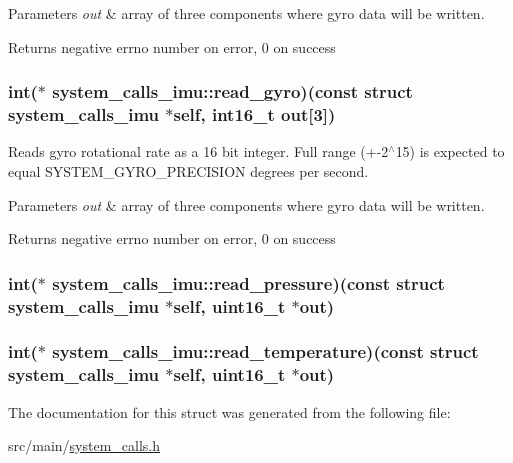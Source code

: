 \begin{DoxyParams}{Parameters}
{\em out} & array of three components where gyro data will be written. \\
\hline
\end{DoxyParams}
\begin{DoxyReturn}{Returns}
negative errno number on error, 0 on success 
\end{DoxyReturn}
\hypertarget{structsystem__calls__imu_ab1f03b777e691071d7e4a3457ddf2bc9}{
\subsubsection[{read\+\_\+gyro}]{\setlength{\rightskip}{0pt plus 5cm}int($\ast$ system\+\_\+calls\+\_\+imu\+::read\+\_\+gyro)(const struct {\bf system\+\_\+calls\+\_\+imu} $\ast$self, int16\+\_\+t out\mbox{[}3\mbox{]})}}\label{structsystem__calls__imu_ab1f03b777e691071d7e4a3457ddf2bc9}
Reads gyro rotational rate as a 16 bit integer. Full range (+-\/2$^\wedge$15) is expected to equal S\+Y\+S\+T\+E\+M\+\_\+\+G\+Y\+R\+O\+\_\+\+P\+R\+E\+C\+I\+S\+I\+O\+N degrees per second.


\begin{DoxyParams}{Parameters}
{\em out} & array of three components where gyro data will be written. \\
\hline
\end{DoxyParams}
\begin{DoxyReturn}{Returns}
negative errno number on error, 0 on success 
\end{DoxyReturn}
\hypertarget{structsystem__calls__imu_a3c4156ffcb688f20f98f289c7340ae3d}{
\subsubsection[{read\+\_\+pressure}]{\setlength{\rightskip}{0pt plus 5cm}int($\ast$ system\+\_\+calls\+\_\+imu\+::read\+\_\+pressure)(const struct {\bf system\+\_\+calls\+\_\+imu} $\ast$self, uint16\+\_\+t $\ast$out)}}\label{structsystem__calls__imu_a3c4156ffcb688f20f98f289c7340ae3d}
\hypertarget{structsystem__calls__imu_a0d4dff52f5fc7c1af893a1b166470b5d}{
\subsubsection[{read\+\_\+temperature}]{\setlength{\rightskip}{0pt plus 5cm}int($\ast$ system\+\_\+calls\+\_\+imu\+::read\+\_\+temperature)(const struct {\bf system\+\_\+calls\+\_\+imu} $\ast$self, uint16\+\_\+t $\ast$out)}}\label{structsystem__calls__imu_a0d4dff52f5fc7c1af893a1b166470b5d}


The documentation for this struct was generated from the following file\+:\begin{DoxyCompactItemize}
\item 
src/main/\hyperlink{system__calls_8h}{system\+\_\+calls.\+h}\end{DoxyCompactItemize}
